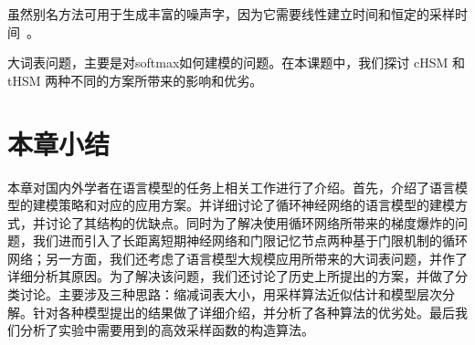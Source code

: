 虽然别名方法可用于生成丰富的噪声字，因为它需要线性建立时间和恒定的采样时间~。

大词表问题，主要是对softmax如何建模的问题。在本课题中，我们探讨 cHSM 和 tHSM 两种不同的方案所带来的影响和优劣。
\section{本章小结}
本章对国内外学者在语言模型的任务上相关工作进行了介绍。首先，介绍了语言模型的建模策略和对应的应用方案。并详细讨论了循环神经网络的语言模型的建模方式，并讨论了其结构的优缺点。同时为了解决使用循环网络所带来的梯度爆炸的问题，我们进而引入了长距离短期神经网络和门限记忆节点两种基于门限机制的循环网络；另一方面，我们还考虑了语言模型大规模应用所带来的大词表问题，并作了详细分析其原因。为了解决该问题，我们还讨论了历史上所提出的方案，并做了分类讨论。主要涉及三种思路：缩减词表大小，用采样算法近似估计和模型层次分解。针对各种模型提出的结果做了详细介绍，并分析了各种算法的优劣处。最后我们分析了实验中需要用到的高效采样函数的构造算法。